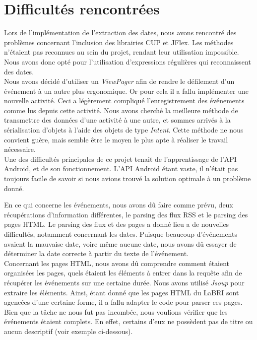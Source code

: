 \chapter{Difficultés rencontrées}

Lors de l’implémentation de l’extraction des dates, nous avons rencontré des problèmes concernant l’inclusion des librairies CUP et JFlex. Les méthodes n’étaient pas reconnues au sein du projet, rendant leur utilisation impossible.
Nous avons donc opté pour l'utilisation d'expressions régulières qui reconnaissent des dates. \\

Nous avons décidé d'utiliser un \emph{ViewPager} afin de rendre le défilement d’un événement à un autre plus ergonomique. Or pour cela il a fallu implémenter une nouvelle activité. Ceci a légèrement compliqué l'enregistrement des événements comme lus depuis cette activité. Nous avons cherché la meilleure méthode de transmettre des données d’une activité à une autre, et sommes arrivés à la sérialisation d’objets à l'aide des objets de type \emph{Intent}. Cette méthode ne nous convient guère, mais semble être le moyen le plus apte à réaliser le travail nécessaire. \\

Une des difficultés principales de ce projet tenait de l’apprentissage de l’API Android, et de son fonctionnement. L’API Android étant vaste, il n’était pas toujours facile de savoir si nous avions trouvé la solution optimale à un problème donné.

En ce qui concerne les événements, nous avons dû faire comme prévu, deux récupérations d’information différentes, le parsing des flux RSS et le parsing des pages HTML.
Le parsing des flux et des pages a donné lieu a de nouvelles difficultés, notamment concernant les dates. Puisque beaucoup d'événements avaient la mauvaise date, voire même aucune date, nous avons dû essayer de déterminer la date correcte à partir du texte de l'événement. \\


Concernant les pages HTML, nous avons dû comprendre comment étaient organisées les pages, quels étaient les éléments à entrer dans la requête afin de récupérer les événements sur une certaine durée. Nous avons utilisé \emph{Jsoup} pour extraire les éléments. Ainsi, étant donné que les pages HTML du LaBRI sont agencées d'une certaine forme, il a fallu adapter le code pour parser ces pages.
Bien que la tâche ne nous fut pas incombée, nous voulions vérifier que les événements étaient complets. En effet, certains d’eux ne possèdent pas de titre ou aucun descriptif (voir exemple ci-dessous).

